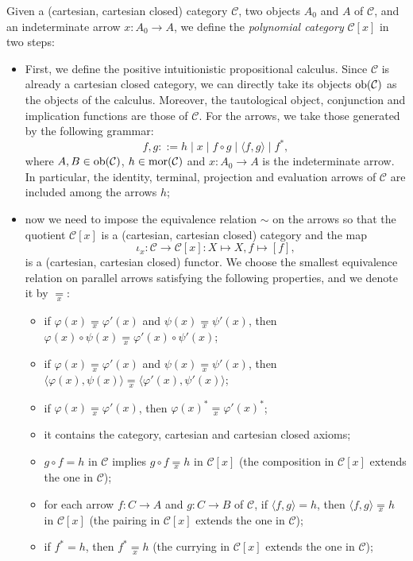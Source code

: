 \begin{definition}
    Given a (cartesian, cartesian closed) category $\mathcal C$, two objects $A_0$ and $A$ of $\mathcal C$, and an indeterminate arrow $x : A_0 \to A$, we define the \emph{polynomial category} $\mathcal C[x]$
    in two steps:
    \begin{itemize}
        \item First, we define the positive intuitionistic propositional calculus. Since $\mathcal C$ is already a cartesian closed category, we can directly take its objects $\operatorname{ob}(\mathcal C)$ as the objects of the calculus. Moreover, the tautological object, conjunction and implication functions are those of $\mathcal C$. For the arrows, we take those generated by the following grammar:
        \[ f,g ::= h \mid x \mid f \circ g \mid \langle f, g \rangle \mid f^*, \]
        where $A, B \in \operatorname{ob}(\mathcal C)$, $h \in \operatorname{mor}(\mathcal C)$ and $x : A_0 \to A$ is the indeterminate arrow. In particular, the identity, terminal, projection and evaluation arrows of $\mathcal C$ are included among the arrows $h$;
        \item now we need to impose the equivalence relation $\sim$ on the arrows so that the quotient $\mathcal C[x]$ is a (cartesian, cartesian closed) category and the map
        \[ \iota_x : \mathcal C \to \mathcal C[x] : X \mapsto X, f \mapsto [f], \]
        is a (cartesian, cartesian closed) functor. We choose the smallest equivalence relation on parallel arrows satisfying the following properties, and we denote it by $\underset{x}{=}$:\label{idx:polynomial-equality}
        \begin{itemize}[label=$\ast$]
            \item if $\varphi(x) \underset{x}{=} \varphi'(x)$ and $\psi(x) \underset{x}{=} \psi'(x)$, then $\varphi(x) \circ \psi(x) \underset{x}{=} \varphi'(x) \circ \psi'(x)$;
            \item if $\varphi(x) \underset{x}{=} \varphi'(x)$ and $\psi(x) \underset{x}{=} \psi'(x)$, then $\langle \varphi(x), \psi(x)\rangle \underset{x}{=} \langle \varphi'(x), \psi'(x)\rangle$;
            \item if $\varphi(x) \underset{x}{=} \varphi'(x)$, then $\varphi(x)^* \underset{x}{=} \varphi'(x)^*$;
            \item it contains the category, cartesian and cartesian closed axioms;
            \item $g \circ f = h$ in $\mathcal C$ implies $g \circ f \underset{x}{=} h$ in $\mathcal C[x]$ (the composition in $\mathcal C[x]$ extends the one in $\mathcal C$);
            \item for each arrow $f : C \to A$ and $g : C \to B$ of $\mathcal C$, if $\langle f, g \rangle = h$, then $\langle f, g \rangle \underset{x}{=} h$ in $\mathcal C[x]$ (the pairing in $\mathcal C[x]$ extends the one in $\mathcal C$);
            \item if $f^* = h$, then $f^* \underset{x}{=} h$ (the currying in $\mathcal C[x]$ extends the one in $\mathcal C$);
        \end{itemize}
    \end{itemize}
\end{definition}

